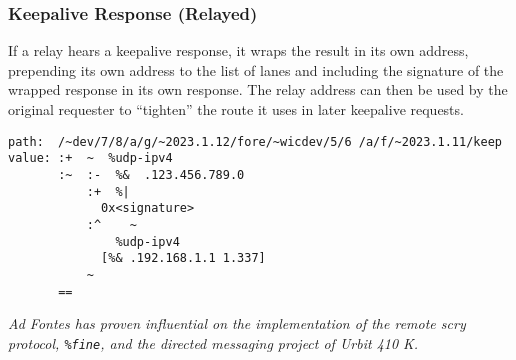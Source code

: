 \documentclass[twoside]{article}
\begin{document}
\subsubsection{Keepalive Response (Relayed)}

If a relay hears a keepalive response, it wraps the result in its own address, prepending its own address to the list of lanes and including the signature of the wrapped response in its own response. The relay address can then be used by the original requester to ``tighten'' the route it uses in later keepalive requests.

\begin{lstlisting}[style=listingcode]
path:  /~dev/7/8/a/g/~2023.1.12/fore/~wicdev/5/6 /a/f/~2023.1.11/keep
value: :+  ~  %udp-ipv4
       :~  :-  %&  .123.456.789.0
           :+  %|
             0x<signature>
           :^    ~
               %udp-ipv4
             [%& .192.168.1.1 1.337]
           ~
       ==
\end{lstlisting}

\noindent
\emph{Ad Fontes has proven influential on the implementation of the remote scry protocol, \texttt{\%fine}, and the directed messaging project of Urbit 410 K.}\tombstone{}

\printbibliography
\afterpage{\blankpage}
\end{document}
